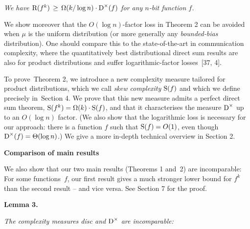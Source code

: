 \documentclass[10pt,a4paper]{article}
\begin{document}
\emph{We have ${\textup{R}}(f^{k})\,\geq\,\Omega(k/\log n)\cdot{\textup{D}}^{\times}(f)$ for any $n$-bit function $f$.}\par






We show moreover that the $O(\log n)$-factor loss in Theorem 2 can be avoided when $\mu$ is the uniform distribution (or more generally any \emph{bounded-bias} distribution). One should compare this to the state-of-the-art in communication complexity, where the quantitatively best distributional direct sum results are also for product distributions and suffer logarithmic-factor losses [37, 4].\par




To prove Theorem 2, we introduce a new complexity measure tailored for product distributions, which we call \emph{skew complexity} ${\textup{S}}(f)$ and which we define precisely in Section 4. We prove that this new measure admits a perfect direct sum theorem, ${\textup{S}}(f^{k})=\Omega(k)\cdot{\textup{S}}(f)$, and that it characterises the measure ${\textup{D}}^{\times}$ up to an $O(\log n)$ factor. (We also show that the logarithmic loss is necessary for our approach: there is a function $f$ such that ${\textup{S}}(f)=O(1)$, even though ${\textup{D}}^{\times}(f)=\Theta(\log n)$.) We give a more in-depth technical overview in Section 2.\par




\par\medskip\noindent\textbf{Comparison of main results}\par




We also show that our two main results (Theorems 1 and 2) are incomparable: For some functions $f$, our first result gives a much stronger lower bound for $f^{k}$ than the second result – and vice versa. See Section 7 for the proof.\par





\par\medskip\noindent\textbf{
\textbf{Lemma 3}\textbf{.}
}\par



\emph{The complexity measures disc and ${\textup{D}}^{\times}$ are incomparable:}\par
\end{document}
